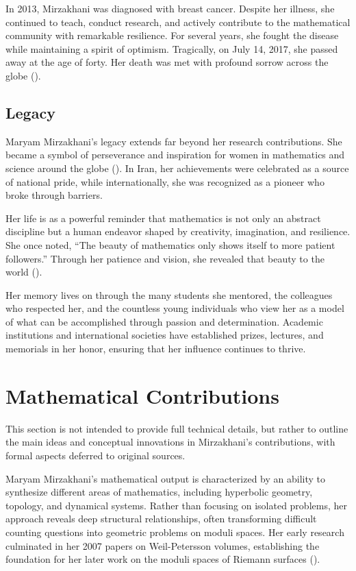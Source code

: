 In 2013, Mirzakhani was diagnosed with breast cancer. Despite her illness, she continued to teach, conduct research, and actively contribute to the mathematical community with remarkable resilience. For several years, she fought the disease while maintaining a spirit of optimism. Tragically, on July 14, 2017, she passed away at the age of forty. Her death was met with profound sorrow across the globe (\cite{zagrebnov,series}).

\subsection{Legacy}
Maryam Mirzakhani's legacy extends far beyond her research contributions. She became a symbol of perseverance and inspiration for women in mathematics and science around the globe (\cite{zagrebnov}). In Iran, her achievements were celebrated as a source of national pride, while internationally, she was recognized as a pioneer who broke through barriers.

Her life is as a powerful reminder that mathematics is not only an abstract discipline but a human endeavor shaped by creativity, imagination, and resilience. She once noted, “The beauty of mathematics only shows itself to more patient followers.” Through her patience and vision, she revealed that beauty to the world (\cite{series}).

Her memory lives on through the many students she mentored, the colleagues who respected her, and the countless young individuals who view her as a model of what can be accomplished through passion and determination. Academic institutions and international societies have established prizes, lectures, and memorials in her honor, ensuring that her influence continues to thrive.

\section{Mathematical Contributions}

This section is not intended to provide full technical details, but rather to outline the main ideas and conceptual innovations in Mirzakhani's contributions, with formal aspects deferred to original sources.

Maryam Mirzakhani's mathematical output is characterized by an ability to synthesize different areas of mathematics, including hyperbolic geometry, topology, and dynamical systems. Rather than focusing on isolated problems, her approach reveals deep structural relationships, often transforming difficult counting questions into geometric problems on moduli spaces. Her early research culminated in her 2007 papers on Weil-Petersson volumes, establishing the foundation for her later work on the moduli spaces of Riemann surfaces (\cite{Mirzakhani2007a, Mirzakhani2007b}). 

